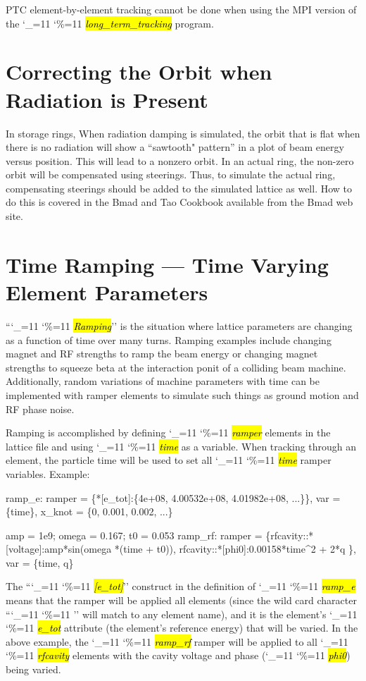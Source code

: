 \documentclass{hitec}
\newcommand\dottcmd[1]{\hl{\em#1}\endgroup}
\newcommand{\vn}{\begingroup\catcode`\_=11 \catcode`\%=11 \dottcmd}
\newcommand{\ltt}{\vn{long_term_tracking}\xspace}
\newcommand{\Section}[1]{\section{#1}\vspace*{-1ex}}
\begin{document}
{{{{{{{{{{{{{{PTC element-by-element tracking cannot be done when using the MPI version of the \ltt program.

\Section{Correcting the Orbit when Radiation is Present}

In storage rings, When radiation damping is simulated, the orbit that is flat when there is no
radiation will show a ``sawtooth" pattern'' in a plot of beam energy versus position. This will lead
to a nonzero orbit. In an actual ring, the non-zero orbit will be compensated using steerings. Thus,
to simulate the actual ring, compensating steerings should be added to the simulated lattice as
well. How to do this is covered in the Bmad and Tao Cookbook available from the Bmad web site.

\Section{Time Ramping --- Time Varying Element Parameters}
\label{s:ramp}

``\vn{Ramping}'' is the situation where lattice parameters are changing as a function of time over
many turns. Ramping examples include changing magnet and RF strengths to ramp the beam energy or
changing magnet strengths to squeeze beta at the interaction ponit of a colliding beam
machine. Additionally, random variations of machine parameters with time can be implemented with
ramper elements to simulate such things as ground motion and RF phase noise.

Ramping is accomplished by defining \vn{ramper} elements in the lattice file and using \vn{time} as
a variable. When tracking through an element, the particle time will be used to set all \vn{time}
ramper variables. Example:
\begin{code}
ramp_e: ramper = \{*[e_tot]:\{4e+08, 4.00532e+08, 4.01982e+08, ...\}\},
              var = \{time\}, x_knot = \{0, 0.001, 0.002, ...\}

amp = 1e9;  omega = 0.167;  t0 = 0.053
ramp_rf: ramper = \{rfcavity::*[voltage]:amp*sin(omega *(time + t0)),
      rfcavity::*[phi0]:0.00158*time^2 + 2*q \}, var = \{time, q\}
\end{code}
The ``\vn{*[e_tot]}'' construct in the definition of \vn{ramp_e} means that the ramper will be
applied all elements (since the wild card character ``\vn{*}'' will match to any element name), and
it is the element's \vn{e_tot} attribute (the element's reference energy) that will be varied.
In the above example, the \vn{ramp_rf} ramper will be applied to all \vn{rfcavity} elements with
the cavity voltage and phase (\vn{phi0}) being varied.

}}}}}}}}}}}}}}
\end{document}
